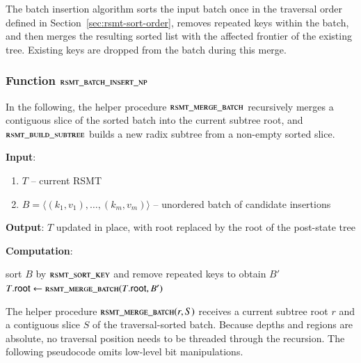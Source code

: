 The batch insertion algorithm sorts the input batch once in the traversal order defined in Section~\ref{sec:rsmt-sort-order}, removes repeated keys within the batch, and then merges the resulting sorted list with the affected frontier of the existing tree. Existing keys are dropped from the batch during this merge.

\subsubsection{Function $\textsc{rsmt\_batch\_insert\_np}$}\label{sec:rsmt-batch-insert-np}

In the following, the helper procedure $\textsc{rsmt\_merge\_batch}$ recursively merges a contiguous slice of the sorted batch into the current subtree root, and $\textsc{rsmt\_build\_subtree}$ builds a new radix subtree from a non-empty sorted slice.

\textbf{Input}:
\begin{enumerate}
	\item $T$ -- current RSMT
	\item $B = \langle (k_1, v_1), \ldots, (k_m, v_m) \rangle$ -- unordered batch of candidate insertions
\end{enumerate}

\textbf{Output}:
$T$ updated in place, with root replaced by the root of the post-state tree

\textbf{Computation}:
\begin{algorithmic}
		\State sort $B$ by $\textsc{rsmt\_sort\_key}$ and remove repeated keys to obtain $B'$
			\State \Return
		\EndIf
		\State $T.\mathsf{root} \gets \Call{rsmt\_merge\_batch}{T.\mathsf{root}, B'}$
	\EndFunction
\end{algorithmic}


The helper procedure $\textsc{rsmt\_merge\_batch}(r, S)$ receives a current subtree root $r$ and a contiguous slice $S$ of the traversal-sorted batch. Because depths and regions are absolute, no traversal position needs to be threaded through the recursion. The following pseudocode omits low-level bit manipulations.

